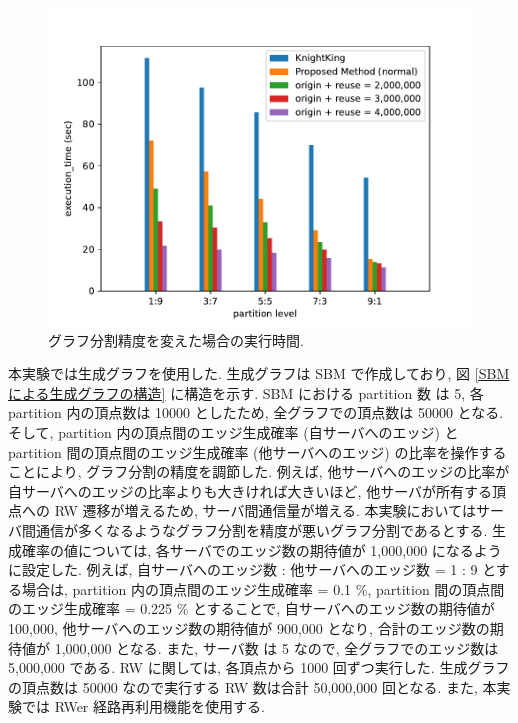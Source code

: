 \begin{figure}[t!]
    \centering
    \includegraphics[scale=0.9]{figure/Kn_vs_AR_partition_level.pdf}
    \caption{グラフ分割精度を変えた場合の実行時間.}
    \label{グラフ分割の汚さを変えた場合の実行時間の結果}
\end{figure}

本実験では生成グラフを使用した. 生成グラフは SBM で作成しており, 図 \ref{SBM による生成グラフの構造} に構造を示す. SBM における partition 数 は 5, 各 partition 内の頂点数は 10000 としたため, 全グラフでの頂点数は 50000 となる. そして, partition 内の頂点間のエッジ生成確率 (自サーバへのエッジ) と partition 間の頂点間のエッジ生成確率 (他サーバへのエッジ) の比率を操作することにより, グラフ分割の精度を調節した. 例えば, 他サーバへのエッジの比率が自サーバへのエッジの比率よりも大きければ大きいほど, 他サーバが所有する頂点への RW 遷移が増えるため, サーバ間通信量が増える.  本実験においてはサーバ間通信が多くなるようなグラフ分割を精度が悪いグラフ分割であるとする. 生成確率の値については, 各サーバでのエッジ数の期待値が 1,000,000 になるように設定した. 例えば, 自サーバへのエッジ数 : 他サーバへのエッジ数 = 1 : 9 とする場合は, partition 内の頂点間のエッジ生成確率 = 0.1 \%, partition 間の頂点間のエッジ生成確率 = 0.225 \% とすることで, 自サーバへのエッジ数の期待値が 100,000, 他サーバへのエッジ数の期待値が 900,000 となり, 合計のエッジ数の期待値が 1,000,000 となる. また, サーバ数 は 5 なので, 全グラフでのエッジ数は 5,000,000 である. RW に関しては, 各頂点から 1000 回ずつ実行した. 生成グラフの頂点数は 50000 なので実行する RW 数は合計 50,000,000 回となる. また, 本実験では RWer 経路再利用機能を使用する. 

